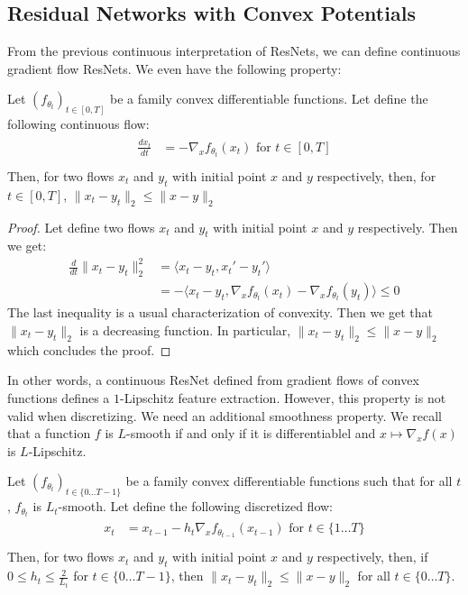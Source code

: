 \subsection{Residual Networks with Convex Potentials}
From the previous continuous interpretation of ResNets, we can define continuous gradient flow ResNets. We even have the following property:

\begin{prop} 
Let $(f_{\theta_t})_{t\in[0,T]}$ be a family convex differentiable functions. Let define the following continuous flow:
\begin{align*}
    \begin{array}{ll}
    \frac{dx_{t}}{dt} &= -\nabla_xf_{\theta_{t}}(x_{t})\text{ for } t\in[0,T]\\
  \end{array}
 \end{align*}
Then, for two flows $x_t$ and $y_t$ with initial point $x$ and $y$ respectively, then, for $t\in[0,T]$, $\lVert x_t-y_t\rVert_2\leq \lVert x-y\rVert_2$ 
\end{prop}

\begin{proof}
Let define two flows $x_t$ and $y_t$ with initial point $x$ and $y$ respectively. Then we get:
\begin{align*}
   \frac{d}{dt} \lVert x_t-y_t\rVert_2^2& = \langle x_t-y_t,x_t'-y_t'\rangle\\
    &=- \langle x_t-y_t,\nabla_xf_{\theta_{t}}(x_{t})-\nabla_xf_{\theta_{t}}(y_{t})\rangle\leq 0
\end{align*}
The last inequality is a usual characterization of convexity. Then we get that $\lVert x_t-y_t\rVert_2$ is a decreasing function. In particular, $\lVert x_t-y_t\rVert_2\leq\lVert x-y\rVert_2 $ which concludes the proof.
\end{proof}
In other words, a continuous ResNet defined from gradient flows of convex functions defines a $1$-Lipschitz feature extraction. However, this property is not valid when discretizing. We need an additional smoothness property. We recall that a function $f$ is $L$-smooth if and only if it is differentiablel and $x\mapsto\nabla_x f(x)$ is $L$-Lipschitz.


\begin{prop} 
Let $(f_{\theta_t})_{t\in\{0\dots T-1\}}$ be a family convex differentiable functions such that for all $t$, $f_{\theta_t}$ is $L_t$-smooth. Let define the following discretized flow:
\begin{align*}
    \begin{array}{ll}
    x_{t} &= x_{t-1}-h_t\nabla_xf_{\theta_{t-1}}(x_{t-1})\text{ for } t\in\{1\dots T\}\\
  \end{array}
 \end{align*}
Then, for two flows $x_t$ and $y_t$ with initial point $x$ and $y$ respectively, then, if $0\leq h_t\leq \frac{2}{L_t}$ for $t\in\{0\dots T-1\}$,  then $\lVert x_t-y_t\rVert_2\leq \lVert x-y\rVert_2$  for all $t\in\{0\dots T\}$.
\end{prop}

